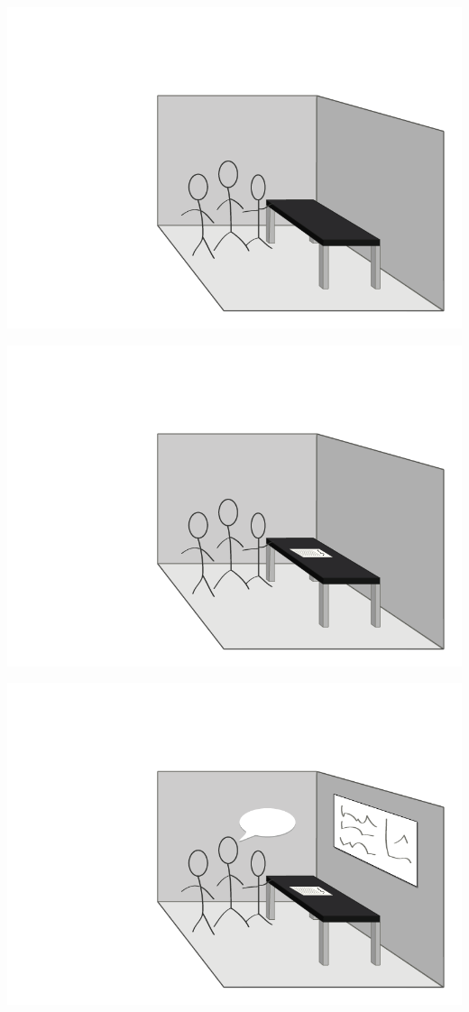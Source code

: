 \begin{frame}{\modelreality}{\topicone} 
\includegraphics[width=\columnwidth]{input/rasmus/ras3.png}
\end{frame}
\begin{frame}{\modelreality}{\topicone} 
\includegraphics[width=\columnwidth]{input/rasmus/ras2.png}
\end{frame}
\begin{frame}{\modelreality}{\topicone} 
\includegraphics[width=\columnwidth]{input/rasmus/ras1.png}
\end{frame}


